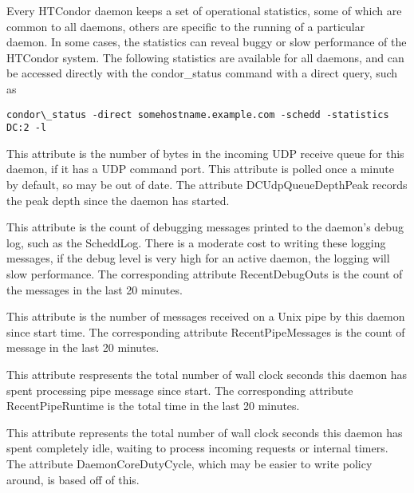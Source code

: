
Every HTCondor daemon keeps a set of operational statistics, some of which are common to all daemons, others are specific to the
running of a particular daemon. In some cases, the statistics can reveal buggy or slow performance of the HTCondor system. The following statistics are available for all daemons, and can be accessed directly with 
the condor\_status command with a direct query, such as

\begin{verbatim}
condor\_status -direct somehostname.example.com -schedd -statistics DC:2 -l
\end{verbatim}

\begin{description}

\item[\AdAttr{DCUdpQueueDepth}:] This attribute is the number of bytes in the incoming UDP receive queue for this daemon, 
if it has a UDP command port.  This attribute is polled once a minute by default, so may be out of date.
The attribute DCUdpQueueDepthPeak records the peak depth since the daemon has started.

\item[\AdAttr{DebugOuts}:] This attribute is the count of debugging messages printed to the daemon's
debug log, such as the ScheddLog. There is a moderate cost to writing these logging messages, 
if the debug level is very high for an active daemon, the logging will slow performance. 
The corresponding attribute RecentDebugOuts is the count of the messages in the last 20 minutes.

\item[\AdAttr{PipeMessages}:] This attribute is the number of messages received on a Unix pipe by this daemon since start time.  The corresponding attribute RecentPipeMessages is the count of message in the last 20 minutes.

\item[\AdAttr{PipeRuntime}:] This attribute respresents the total number of wall clock seconds this daemon has spent processing pipe message since start.  The corresponding attribute RecentPipeRuntime is the total time in the last 20 minutes.

\item[\AdAttr{SelectWaittime}:] This attribute represents the total number of wall clock seconds this daemon has spent completely
idle, waiting to process incoming requests or internal timers.  The attribute DaemonCoreDutyCycle, which may be easier to
write policy around, is based off of this.


\end{description}
